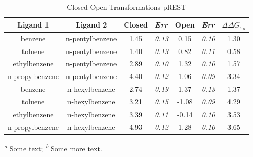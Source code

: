 \documentclass[T4paper.tex]{subfiles}
\begin{document}
\begin{table}[!htb]
\centering
\caption{Closed-Open Transformations pREST}
\label{tbl:C-O_pREST}
\begin{tabular}{|c|c|c|l|c|l|c|}
\hline
\textbf{Ligand 1}                       & \textbf{Ligand 2}                       & {\color[HTML]{800080} \textbf{Closed}} & {\color[HTML]{800080} \textit{Err}} & {\color[HTML]{008000} \textbf{Open}} & {\color[HTML]{008000} \textit{Err}} & \textbf{$\Delta\Delta G_{\boldsymbol{\varepsilon_n}}$}            \\ \hline
\cellcolor[HTML]{800080}benzene         & \cellcolor[HTML]{008000}n-pentylbenzene & 1.45                                   & \textit{0.13}                       & 0.15                                & \textit{0.10}                       & \cellcolor[HTML]{FFCCC9}1.30 \\ \hline
\cellcolor[HTML]{800080}toluene         & \cellcolor[HTML]{008000}n-pentylbenzene & 1.40                                   & \textit{0.13}                       & 0.82                                 & \textit{0.11}                       & \cellcolor[HTML]{9AFF99}0.58 \\ \hline
\cellcolor[HTML]{800080}ethylbenzene    & \cellcolor[HTML]{008000}n-pentylbenzene & 2.89                                   & \textit{0.10}                       & 1.32                                 & \textit{0.10}                       & \cellcolor[HTML]{FFCCC9}1.57 \\ \hline
\cellcolor[HTML]{800080}n-propylbenzene & \cellcolor[HTML]{008000}n-pentylbenzene & 4.40                                   & \textit{0.12}                       & 1.06                                & \textit{0.09}                       & \cellcolor[HTML]{FFCCC9}3.34 \\ \hline
\cellcolor[HTML]{800080}benzene         & \cellcolor[HTML]{008000}n-hexylbenzene  & 2.74                                   & \textit{0.19}                       & 1.37                                & \textit{0.13}                       & \cellcolor[HTML]{FFCCC9}1.37 \\ \hline
\cellcolor[HTML]{800080}toluene         & \cellcolor[HTML]{008000}n-hexylbenzene  & 3.21                                   & \textit{0.15}                       & -1.08                                & \textit{0.09}                       & \cellcolor[HTML]{FFCCC9}4.29 \\ \hline
\cellcolor[HTML]{800080}ethylbenzene    & \cellcolor[HTML]{008000}n-hexylbenzene  & 3.39                                   & \textit{0.11}                       & -0.14                                & \textit{0.10}                       & \cellcolor[HTML]{FFCCC9}3.53 \\ \hline
\cellcolor[HTML]{800080}n-propylbenzene & \cellcolor[HTML]{008000}n-hexylbenzene  & 4.93                                   & \textit{0.12}                       & 1.28                                 & \textit{0.10}                       & \cellcolor[HTML]{FFCCC9}3.65 \\ \hline
\end{tabular}

  \textsuperscript{\emph{a}} Some text;
  \textsuperscript{\emph{b}} Some more text.
\end{table}
\end{document}
